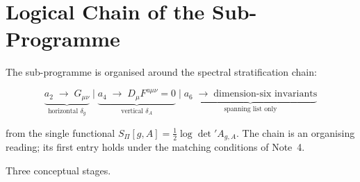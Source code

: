 \documentclass[11pt,a4paper]{article}
\theoremstyle{definition}
\newcommand{\SPI}{S_\Pi}
\begin{document}
  \section{Logical Chain of the Sub-Programme}
    \label{sec:chain}

    The sub-programme is organised around the spectral stratification chain:

    \begin{equation}
      \label{eq:strat}
      \underbrace{a_2 \;\to\; G_{\mu\nu}}_{\text{horizontal } \delta_g}
      \;\Big|\;
      \underbrace{a_4 \;\to\; D_\mu F^{a\mu\nu} = 0}_{\text{vertical } \delta_A}
      \;\Big|\;
      \underbrace{a_6 \;\to\; \text{dimension-six invariants}}_{\text{spanning list only}}
    \end{equation}

    from the single functional $\SPI[g,A] = \tfrac{1}{2}\log\det' A_{g,A}$.
    The chain is an organising reading; its first entry holds under the matching conditions of Note~4.

    Three conceptual stages.
\end{document}
